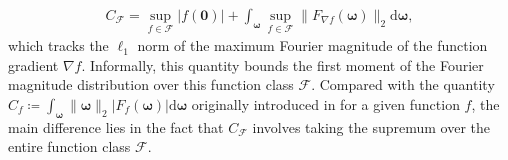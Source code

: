 \documentclass[english]{article}
\begin{document}
%
\begin{align}
\label{eq:condition-Fourier-gradient}
C_{\mathcal{F}} = \sup_{f\in \mathcal{F}}|f(\bm{0})| + \int_{\bm{\omega}} \sup_{f\in \mathcal{F}} \big\| F_{\nabla f}(\bm{\omega}) \big\|_2 
\mathrm{d}\bm{\omega} , 
\end{align}
%
which tracks the $\ell_1$ norm of the maximum Fourier magnitude of the function gradient $\nabla f$. 
Informally, this quantity bounds the first moment of the Fourier magnitude distribution over this function class $\mathcal{F}$.  
Compared with the quantity $C_f\coloneqq \int_{\bm{\omega}} \|\bm{\omega}\|_2|F_f(\bm{\omega})|\mathrm{d}\bm{\omega}$ 
originally introduced in \cite{Barron1993Universal} for a given function $f$, the main difference lies in the fact that $C_{\mathcal{F}}$ involves taking the supremum over the entire function class $\mathcal{F}$. 
%
\end{document}
